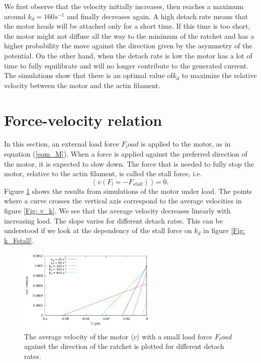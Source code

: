 \documentclass[aps,pre,onecolumn,showpacs,showkeys,a4paper]{revtex4}
\begin{document}
We first observe that the velocity initially increases, then reaches a maximum around $k_{d} = 160 s^{-1}$ and finally decreases again. 
A high detach rate means that the motor heads will be attached only for a short time. 
If this time is too short, the motor might not diffuse all the way to the minimum of the ratchet and has a higher probability the move against the direction given by the asymmetry of the potential. 
On the other hand, when the detach rate is low the motor has a lot of time to fully equilibrate and will no longer contribute to the generated current. 
The simulations show that there is an optimal value of$k_{d}$ to maximize the relative velocity between the motor and the actin filament. 



\section{Force-velocity relation}
In this section, an external load force $F_load$ is applied to the motor, as in equation (\ref{eom_M}). 
When a force is applied against the preferred direction of the motor, it is expected to slow down. 
The force that is needed to fully stop the motor, relative to the actin filament, is called the stall force, i.e. 
\[
\langle\; v ( F_{l} = -F_{stall} )\; \rangle = 0 .
\]
Figure \ref{Fig: F_v_zoom}  shows the results from simulations of the motor under load. 
The points where a curve crosses the vertical axis correspond to the average velocities in figure \ref{Fig: v_k}. 
We see that the average velocity decreases linearly with increasing load. 
The slope varies for different detach rates. This can be understood if we look at the dependency of the stall force on $k_{d}$ in figure \ref{Fig: k_Fstall}.
\begin{figure}[h]
\centering
\includegraphics[width=0.6\textwidth,height=!]{F_v_zoom}
\caption{The average velocity of the motor $\langle v \rangle$ with a small load force $F_load$ against the direction of the ratchet is plotted for different detach rates.}
\label{Fig: F_v_zoom} 
\end{figure}
\end{document}

